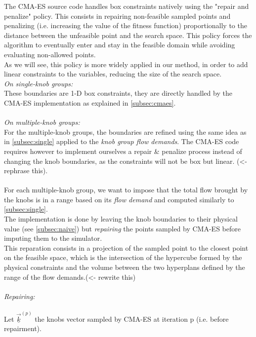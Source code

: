 The CMA-ES source code handles box constraints natively using the "repair and penalize" policy. This consists in repairing non-feasible sampled points and penalizing (i.e. increasing the value of the fitness function) proportionally to the distance between the unfeasible point and the search space. This policy forces the algorithm to eventually enter and stay in the feasible domain while avoiding evaluating non-allowed points.\\
As we will see, this policy is more widely applied in our method, in order to add linear constraints to the variables, reducing the size of the search space.\\


\emph{On single-knob groups:}\\
These boundaries are 1-D box constraints, they are directly handled by the CMA-ES implementation as explained in \ref{subsec:cmaes}.\\
\\
\emph{On multiple-knob groups:}\\
For the multiple-knob groups, the boundaries are refined using the same idea as in \ref{subsec:single} applied to the \emph{knob group flow demands}. The CMA-ES code requires however to implement ourselves a repair \& penalize process instead of changing the knob boundaries, as the constraints will not be box but linear. \color{red}(<- rephrase this)\color{black}.\\
\\
For each multiple-knob group, we want to impose that the total flow brought by the knobs is in a range based on its \emph{flow demand} and computed similarly to \ref{subsec:single}.\\
The implementation is done by leaving the knob boundaries to their physical value (see \ref{subsec:naive}) but \emph{repairing} the points sampled by CMA-ES before imputing them to the simulator.\\
This reparation consists in a projection of the sampled point to the closest point on the feasible space, which is the intersection of the hypercube formed by the physical constraints and the volume between the two hyperplans defined by the range of the flow demands.\color{red}(<- rewrite this)\color{black}\\
\\
\emph{Repairing:}\\
\\
Let $\underline{\vec{k}}^{(p)}$ the knobs vector sampled by CMA-ES at iteration p (i.e. before repairment).\\
